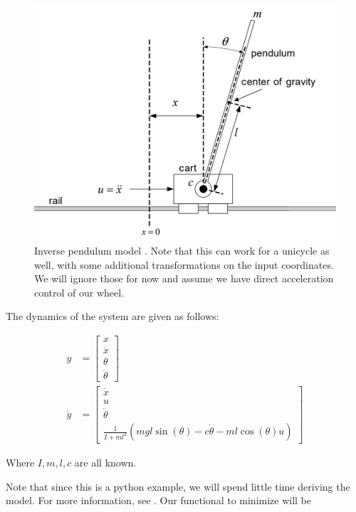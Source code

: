 \documentclass[twoside]{article}
\begin{document}
\begin{figure}[h!]
    \centering
    \includegraphics[width = \textwidth]{inverse_pendulum.png}
    \caption{Inverse pendulum model \cite{inverse_pendulum}. Note that this can work for a unicycle as well, with some additional transformations on the input coordinates. We will ignore those for now and assume we have direct acceleration control of our wheel.}
\end{figure}

The dynamics of the system \cite{inverse_pendulum} are given as follows:

\begin{align*}
    y &= \begin{bmatrix} x \\ \dot{x} \\ \theta \\ \dot{\theta} \end{bmatrix}\\
    \dot{y} &= \begin{bmatrix}
        \dot{x} \\ u \\ \dot{\theta} \\
        \frac{1}{I+ml^2}(mgl\sin(\theta) - c\dot{\theta}-ml\cos(\theta)u)
    \end{bmatrix}
\end{align*}

Where $I,m,l,c$ are all known.

Note that since this is a python example, we will spend little time deriving the model. For more information, see \cite{inverse_pendulum}. Our functional to minimize will be
\end{document}

